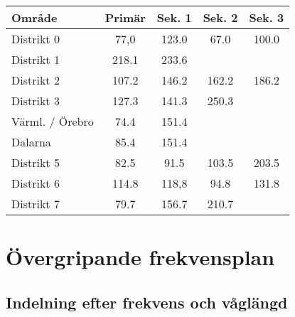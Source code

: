 \begin{tabular}{lcccc}
	\textbf{Område} & \textbf{Primär} & \textbf{Sek. 1} & \textbf{Sek. 2} & \textbf{Sek. 3} \\ \hline
	Distrikt 0      &      77,0       &      123.0      &      67.0       &      100.0      \\
	Distrikt 1      &      218.1      &      233.6      &                 &  \\
	Distrikt 2      &      107.2      &      146.2      &      162.2      &      186.2      \\
	Distrikt 3      &      127.3      &      141.3      &      250.3      &  \\
	Värml. / Örebro &      74.4       &      151.4      &                 &  \\
	Dalarna         &      85.4       &      151.4      &                 &  \\
	Distrikt 5      &      82.5       &      91.5       &      103.5      &      203.5      \\
	Distrikt 6      &      114.8      &      118,8      &      94.8       &      131.8      \\
	Distrikt 7      &      79.7       &      156.7      &      210.7      &
\end{tabular}

\section{Övergripande frekvensplan}

\subsection{Indelning efter frekvens och våglängd}

